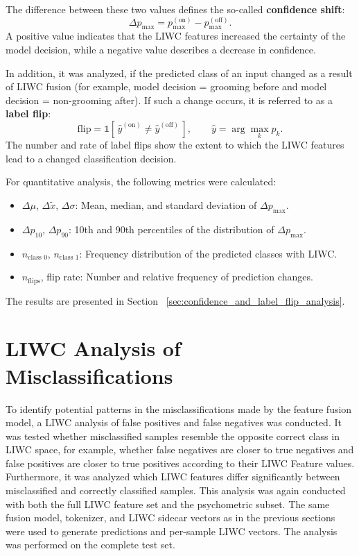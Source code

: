 The difference between these two values defines the so-called \textbf{confidence shift}:
\[
\Delta p_{\max} = p_{\max}^{(\text{on})} - p_{\max}^{(\text{off})}.
\]
A positive value indicates that the LIWC features increased the certainty of the model decision, while a negative value describes a decrease in confidence.

In addition, it was analyzed, if the predicted class of an input changed as a result of LIWC fusion (for example, model decision = grooming before and model decision = non-grooming after). If such a change occurs, it is referred to as a \textbf{label flip}:
\[
\text{flip} = \mathds{1}\!\left[\,\hat{y}^{(\text{on})} \neq \hat{y}^{(\text{off})}\,\right], 
\qquad
\hat{y} = \arg\max_k p_k.
\]
The number and rate of label flips show the extent to which the LIWC features lead to a changed classification decision.

For quantitative analysis, the following metrics were calculated:
\begin{itemize}
    \item $\Delta \mu$, $\Delta \tilde{x}$, $\Delta \sigma$: Mean, median, and standard deviation of \(\Delta p_{\max}\).
    \item $\Delta p_{10}$, $\Delta p_{90}$: 10th and 90th percentiles of the distribution of \(\Delta p_{\max}\).
    \item $n_{\text{class 0}}$, $n_{\text{class 1}}$: Frequency distribution of the predicted classes with LIWC.
    \item $n_{\text{flips}}$, flip rate: Number and relative frequency of prediction changes.
\end{itemize}


The results are presented in Section ~\ref{sec:confidence_and_label_flip_analysis}.

\section{LIWC Analysis of Misclassifications}

To identify potential patterns in the misclassifications made by the feature fusion model, a LIWC analysis of false positives and false negatives was conducted. It was tested whether misclassified samples resemble the opposite correct class in LIWC space, for example, whether false negatives are closer to true negatives and false positives are closer to true positives according to their LIWC Feature values. Furthermore, it was analyzed which LIWC features differ significantly between misclassified and correctly classified samples. This analysis was again conducted with both the full LIWC feature set and the psychometric subset. The same fusion model, tokenizer, and LIWC sidecar vectors as in the previous sections were used to generate predictions and per-sample LIWC vectors. The analysis was performed on the complete test set.

